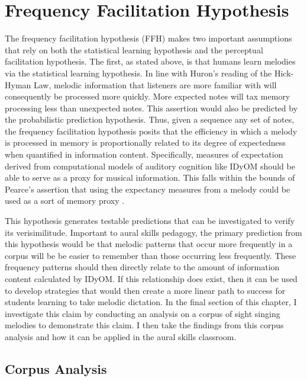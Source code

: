 \documentclass[12pt,]{book}
\begin{document}
\hypertarget{frequency-facilitation-hypothesis}{%
\section{Frequency Facilitation Hypothesis}\label{frequency-facilitation-hypothesis}}

The frequency facilitation hypothesis (FFH) makes two important assumptions that rely on both the statistical learning hypothesis and the perceptual facilitation hypothesis.
The first, as stated above, is that humans learn melodies via the statistical learning hypothesis.
In line with Huron's reading of the Hick-Hyman Law, melodic information that listeners are more familiar with will consequently be processed more quickly.
More expected notes will tax memory processing less than unexpected notes.
This assertion would also be predicted by the probabilistic prediction hypothesis.
Thus, given a sequence any set of notes, the frequency facilitation hypothesis posits that the efficiency in which a melody is processed in memory is proportionally related to its degree of expectedness when quantified in information content.
Specifically, measures of expectation derived from computational models of auditory cognition like IDyOM should be able to serve as a proxy for musical information.
This falls within the bounds of Pearce's assertion that using the expectancy measures from a melody could be used as a sort of memory proxy \citep{pearceStatisticalLearningProbabilistic2018a}.

This hypothesis generates testable predictions that can be investigated to verify its verisimilitude.
Important to aural skills pedagogy, the primary prediction from this hypothesis would be that melodic patterns that occur more frequently in a corpus will be be easier to remember than those occurring less frequently.
These frequency patterns should then directly relate to the amount of information content calculated by IDyOM.
If this relationship does exist, then it can be used to develop strategies that would then create a more linear path to success for students learning to take melodic dictation.
In the final section of this chapter, I investigate this claim by conducting an analysis on a corpus of sight singing melodies to demonstrate this claim.
I then take the findings from this corpus analysis and how it can be applied in the aural skills classroom.

\hypertarget{corpus-analysis}{%
\subsection{Corpus Analysis}\label{corpus-analysis}}
\end{document}

